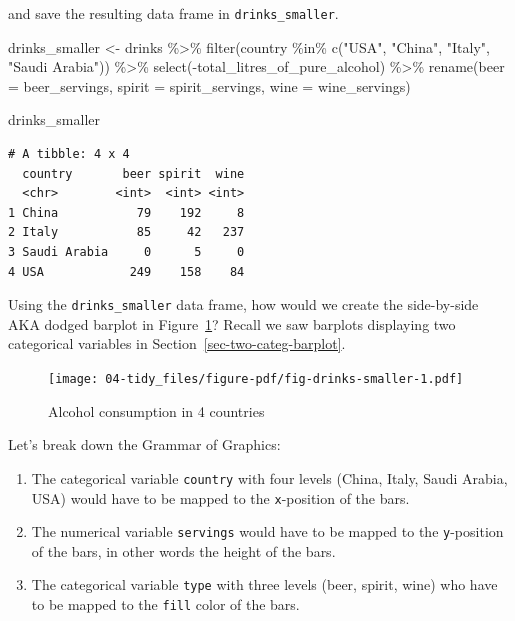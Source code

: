 \documentclass[
  letterpaper,
  DIV=11,
  numbers=noendperiod]{scrreprt}
\newenvironment{Shaded}{\begin{snugshade}}{\end{snugshade}}
\newcommand{\AttributeTok}[1]{\textcolor[rgb]{0.40,0.45,0.13}{#1}}
\newcommand{\FunctionTok}[1]{\textcolor[rgb]{0.28,0.35,0.67}{#1}}
\newcommand{\NormalTok}[1]{\textcolor[rgb]{0.00,0.23,0.31}{#1}}
\newcommand{\OtherTok}[1]{\textcolor[rgb]{0.00,0.23,0.31}{#1}}
\newcommand{\SpecialCharTok}[1]{\textcolor[rgb]{0.37,0.37,0.37}{#1}}
\newcommand{\StringTok}[1]{\textcolor[rgb]{0.13,0.47,0.30}{#1}}
\theoremstyle{definition}
\theoremstyle{remark}
\begin{document}
and save the resulting data frame in \texttt{drinks\_smaller}.

\begin{Shaded}
\begin{Highlighting}[]
\NormalTok{drinks\_smaller }\OtherTok{\textless{}{-}}\NormalTok{ drinks }\SpecialCharTok{\%\textgreater{}\%} 
  \FunctionTok{filter}\NormalTok{(country }\SpecialCharTok{\%in\%} \FunctionTok{c}\NormalTok{(}\StringTok{"USA"}\NormalTok{, }\StringTok{"China"}\NormalTok{, }\StringTok{"Italy"}\NormalTok{, }\StringTok{"Saudi Arabia"}\NormalTok{)) }\SpecialCharTok{\%\textgreater{}\%} 
  \FunctionTok{select}\NormalTok{(}\SpecialCharTok{{-}}\NormalTok{total\_litres\_of\_pure\_alcohol) }\SpecialCharTok{\%\textgreater{}\%} 
  \FunctionTok{rename}\NormalTok{(}\AttributeTok{beer =}\NormalTok{ beer\_servings, }\AttributeTok{spirit =}\NormalTok{ spirit\_servings, }\AttributeTok{wine =}\NormalTok{ wine\_servings)}

\NormalTok{drinks\_smaller}
\end{Highlighting}
\end{Shaded}

\begin{verbatim}
# A tibble: 4 x 4
  country       beer spirit  wine
  <chr>        <int>  <int> <int>
1 China           79    192     8
2 Italy           85     42   237
3 Saudi Arabia     0      5     0
4 USA            249    158    84
\end{verbatim}

Using the \texttt{drinks\_smaller} data frame, how would we create the
side-by-side AKA dodged barplot in Figure~\ref{fig-drinks-smaller}?
Recall we saw barplots displaying two categorical variables in
Section~\ref{sec-two-categ-barplot}.

\begin{figure}

{\centering \texttt{[image: 04-tidy\_files/figure-pdf/fig-drinks-smaller-1.pdf]}

}

\caption{\label{fig-drinks-smaller}Alcohol consumption in 4 countries}

\end{figure}

Let's break down the Grammar of Graphics:

\begin{enumerate}
\def\labelenumi{\arabic{enumi}.}
\item
  The categorical variable \texttt{country} with four levels (China,
  Italy, Saudi Arabia, USA) would have to be mapped to the
  \texttt{x}-position of the bars.
\item
  The numerical variable \texttt{servings} would have to be mapped to
  the \texttt{y}-position of the bars, in other words the height of the
  bars.
\item
  The categorical variable \texttt{type} with three levels (beer,
  spirit, wine) who have to be mapped to the \texttt{fill} color of the
  bars.
\end{enumerate}
\end{document}
